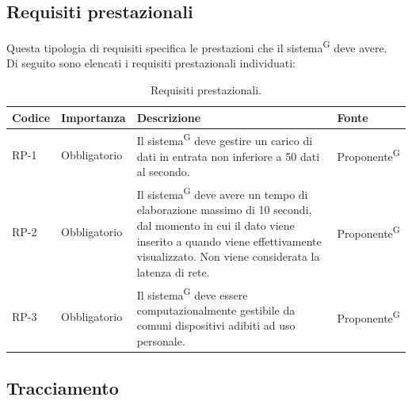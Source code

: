 \documentclass[8pt]{article}
\newcommand{\glossterm}[1]{#1\textsuperscript{G}} %
\begin{document}
\subsection{Requisiti prestazionali}
Questa tipologia di requisiti specifica le prestazioni che il \glossterm{sistema} deve avere. \\
Di seguito sono elencati i requisiti prestazionali individuati:
\begin{longtable}{|>{\centering\arraybackslash}p{1.2cm}|>{\centering\arraybackslash}p{2cm}|>{\centering\arraybackslash}p{8.5cm}|>{\centering\arraybackslash}p{3cm}|}
    \hline
    \rowcolor{white}
    \textbf{Codice} & \textbf{Importanza} & \textbf{Descrizione} & \textbf{Fonte} \\
		\hline
  \endfirsthead
\rowcolor{white}
\caption{Requisiti prestazionali.}
	\label{table:Requisiti prestazionali}
  \endlastfoot
            RP-1 & Obbligatorio & Il \glossterm{sistema} deve gestire un carico di dati in entrata non inferiore a 50 dati al secondo. & \glossterm{Proponente} \\ \hline
            RP-2 & Obbligatorio & Il \glossterm{sistema} deve avere un tempo di elaborazione massimo di 10 secondi, dal momento in cui il dato viene inserito a quando viene effettivamente visualizzato. Non viene considerata la latenza di rete. & \glossterm{Proponente} \\ \hline
            RP-3 & Obbligatorio & Il \glossterm{sistema} deve essere computazionalmente gestibile da comuni dispositivi adibiti ad uso personale. & \glossterm{Proponente} \\ \hline
\end{longtable}
\subsection{Tracciamento} \label{sec:track}
\end{document}
